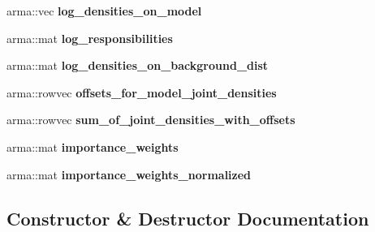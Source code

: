 \begin{DoxyCompactItemize}
\item 
arma\+::vec {\bfseries log\+\_\+densities\+\_\+on\+\_\+model}\hypertarget{classVIPS_a6c98147f1bba2bf4467714bb1070f5b6}{}\label{classVIPS_a6c98147f1bba2bf4467714bb1070f5b6}

\item 
arma\+::mat {\bfseries log\+\_\+responsibilities}\hypertarget{classVIPS_a17f93d9215dbee5127d94fd65b61848e}{}\label{classVIPS_a17f93d9215dbee5127d94fd65b61848e}

\item 
arma\+::mat {\bfseries log\+\_\+densities\+\_\+on\+\_\+background\+\_\+dist}\hypertarget{classVIPS_abe994fe945632006165a985c4c89f4b8}{}\label{classVIPS_abe994fe945632006165a985c4c89f4b8}

\item 
arma\+::rowvec {\bfseries offsets\+\_\+for\+\_\+model\+\_\+joint\+\_\+densities}\hypertarget{classVIPS_a05cf1526a1aaa34cfd76f2f7b9f1f653}{}\label{classVIPS_a05cf1526a1aaa34cfd76f2f7b9f1f653}

\item 
arma\+::rowvec {\bfseries sum\+\_\+of\+\_\+joint\+\_\+densities\+\_\+with\+\_\+offsets}\hypertarget{classVIPS_a825e8ea57d1c72d0941e1d5fc4c68ab3}{}\label{classVIPS_a825e8ea57d1c72d0941e1d5fc4c68ab3}

\item 
arma\+::mat {\bfseries importance\+\_\+weights}\hypertarget{classVIPS_ac318b08a7f1e3e7d386da8921f69db5c}{}\label{classVIPS_ac318b08a7f1e3e7d386da8921f69db5c}

\item 
arma\+::mat {\bfseries importance\+\_\+weights\+\_\+normalized}\hypertarget{classVIPS_aedb1fb27412374a577219711f083dd7d}{}\label{classVIPS_aedb1fb27412374a577219711f083dd7d}

\end{DoxyCompactItemize}


\subsection{Constructor \& Destructor Documentation}
